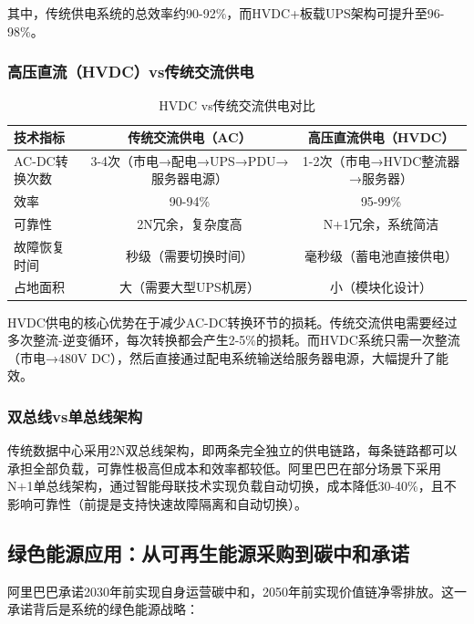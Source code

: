 其中，传统供电系统的总效率约90-92\%，而HVDC+板载UPS架构可提升至96-98\%。

\subsubsection{高压直流（HVDC）vs传统交流供电}

\begin{table}[htbp]
\centering
\caption{HVDC vs传统交流供电对比}
\begin{tabular}{lcc}
\toprule
\textbf{技术指标} & \textbf{传统交流供电（AC）} & \textbf{高压直流供电（HVDC）} \\
\midrule
AC-DC转换次数 & 3-4次（市电→配电→UPS→PDU→服务器电源） & 1-2次（市电→HVDC整流器→服务器） \\
效率 & 90-94\% & 95-99\% \\
可靠性 & 2N冗余，复杂度高 & N+1冗余，系统简洁 \\
故障恢复时间 & 秒级（需要切换时间） & 毫秒级（蓄电池直接供电） \\
占地面积 & 大（需要大型UPS机房） & 小（模块化设计） \\
\bottomrule
\end{tabular}
\label{tab:hvdc-vs-ac}
\end{table}

HVDC供电的核心优势在于减少AC-DC转换环节的损耗。传统交流供电需要经过多次整流-逆变循环，每次转换都会产生2-5\%的损耗。而HVDC系统只需一次整流（市电→480V DC），然后直接通过配电系统输送给服务器电源，大幅提升了能效。

\subsubsection{双总线vs单总线架构}

传统数据中心采用2N双总线架构，即两条完全独立的供电链路，每条链路都可以承担全部负载，可靠性极高但成本和效率都较低。阿里巴巴在部分场景下采用N+1单总线架构，通过智能母联技术实现负载自动切换，成本降低30-40\%，且不影响可靠性（前提是支持快速故障隔离和自动切换）。

\subsection{绿色能源应用：从可再生能源采购到碳中和承诺}

阿里巴巴承诺2030年前实现自身运营碳中和，2050年前实现价值链净零排放。这一承诺背后是系统的绿色能源战略：

